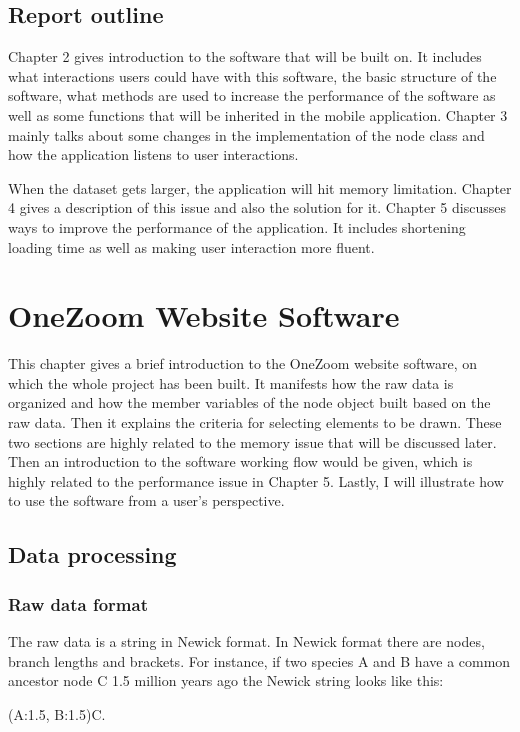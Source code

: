 \documentclass[a4paper,11pt,twoside]{report}
\begin{document}
\section{Report outline}

Chapter 2 gives introduction to the software that will be built on. It includes what interactions users could have with this software, the basic structure of the software, what methods are used to increase the performance of the software as well as some functions that will be inherited in the mobile application. Chapter 3 mainly talks about some changes in the implementation of the node class and how the application listens to user interactions. 

 When the dataset gets larger, the application will hit memory limitation. Chapter 4 gives a description of this issue and also the solution for it. Chapter 5 discusses ways to improve the performance of the application. It includes shortening loading time as well as making user interaction more fluent.
 

\chapter{OneZoom Website Software}

This chapter gives a brief introduction to the OneZoom website software, on which the whole project has been built. It manifests how the raw data is organized and how the member variables of the node object built based on the raw data. Then it explains the criteria for selecting elements to be drawn. These two sections are highly related to the memory issue that will be discussed later. Then an introduction to the software working flow would be given, which is highly related to the performance issue in Chapter 5. Lastly, I will illustrate how to use the software from a user's perspective.

\section{Data processing}

\subsection{Raw data format}

The raw data is a string in Newick format. In Newick format there are nodes, branch lengths and brackets. For instance, if two species A and B have a common ancestor node C 1.5 million years ago the Newick string looks like this: 
\begin{center}
	(A:1.5, B:1.5)C. 
\end{center}
\end{document}
